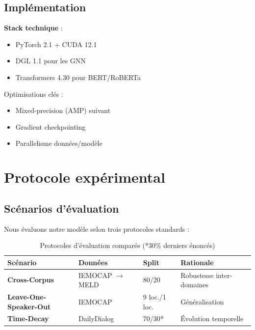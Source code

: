 \documentclass[a4paper,11pt]{article}
\begin{document}
\subsection{Implémentation}
\textbf{Stack technique} :
\begin{itemize}
    \item PyTorch 2.1 + CUDA 12.1
    \item DGL 1.1 pour les GNN
    \item Transformers 4.30 pour BERT/RoBERTa
\end{itemize}

Optimisations clés :
\begin{itemize}
    \item Mixed-precision (AMP) suivant \cite{micikevicius2018mixed}
    \item Gradient checkpointing \cite{chen2016training}
    \item Parallelisme données/modèle \cite{rajbhandari2020zero}
\end{itemize}





\section{Protocole expérimental}
\subsection{Scénarios d'évaluation}
Nous évaluons notre modèle selon trois protocoles standards \cite{poria2019benchmark} :

\begin{table}[h]
\centering
\begin{tabular}{llll}
\toprule
Scénario & Données & Split & Rationale \\
\midrule
\textbf{Cross-Corpus} & IEMOCAP $\rightarrow$ MELD & 80/20 & Robustesse inter-domaines \cite{zhou2020cross} \\
\textbf{Leave-One-Speaker-Out} & IEMOCAP & 9 loc./1 loc. & Généralisation \cite{kaya2017exploiting} \\
\textbf{Time-Decay} & DailyDialog & 70/30* & Évolution temporelle \cite{chandra2021temporal} \\
\bottomrule
\end{tabular}
\caption{Protocoles d'évaluation comparés (*30\% derniers énoncés)}
\label{tab:protocols}
\end{table}
\end{document}
